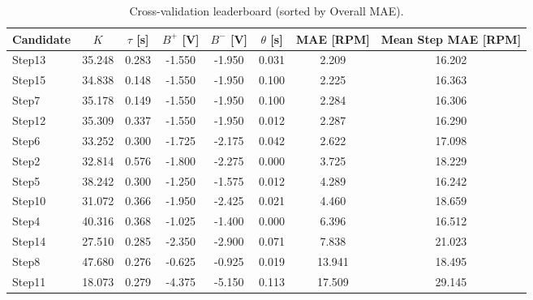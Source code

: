 
\begin{table*}[t] 
\centering
\caption{Cross-validation leaderboard (sorted by Overall MAE).}
\label{tab:cv_leaderboard}
\begin{tabular}{@{}lccccccc@{}}
\toprule
Candidate & $K$ & $\tau$ [s] & $B^+$ [V] & $B^-$ [V] & $\theta$ [s] & MAE [RPM] & Mean Step MAE [RPM] \\
\midrule
Step13 & 35.248 & 0.283 & -1.550 & -1.950 & 0.031 & 2.209 & 16.202 \\
Step15 & 34.838 & 0.148 & -1.550 & -1.950 & 0.100 & 2.225 & 16.363 \\
Step7 & 35.178 & 0.149 & -1.550 & -1.950 & 0.100 & 2.284 & 16.306 \\
Step12 & 35.309 & 0.337 & -1.550 & -1.950 & 0.012 & 2.287 & 16.290 \\
Step6 & 33.252 & 0.300 & -1.725 & -2.175 & 0.042 & 2.622 & 17.098 \\
Step2 & 32.814 & 0.576 & -1.800 & -2.275 & 0.000 & 3.725 & 18.229 \\
Step5 & 38.242 & 0.300 & -1.250 & -1.575 & 0.012 & 4.289 & 16.242 \\
Step10 & 31.072 & 0.366 & -1.950 & -2.425 & 0.021 & 4.460 & 18.659 \\
Step4 & 40.316 & 0.368 & -1.025 & -1.400 & 0.000 & 6.396 & 16.512 \\
Step14 & 27.510 & 0.285 & -2.350 & -2.900 & 0.071 & 7.838 & 21.023 \\
Step8 & 47.680 & 0.276 & -0.625 & -0.925 & 0.019 & 13.941 & 18.495 \\
Step11 & 18.073 & 0.279 & -4.375 & -5.150 & 0.113 & 17.509 & 29.145 \\
\bottomrule
\end{tabular}
\end{table*}